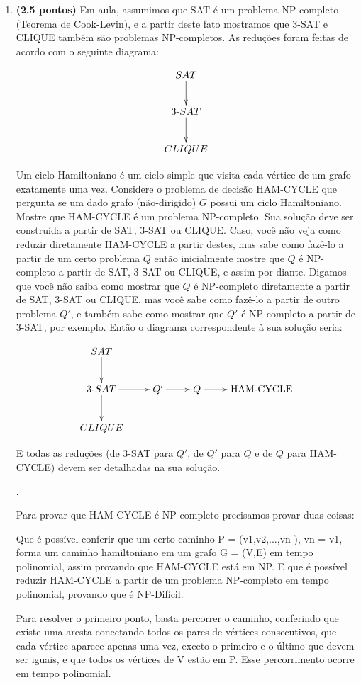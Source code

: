 \documentclass[12pt]{article}
\newcommand{\resposta}[1]{ \noindent {\bf Solução}.{\color{blue} #1}}
\begin{document}
\begin{enumerate}
{ }
  
\item {\bf (2.5 pontos)} Em aula, assumimos que SAT é um problema
  NP-completo (Teorema de Cook-Levin), e a partir deste fato mostramos
  que 3-SAT e CLIQUE também são problemas NP-completos. As reduções
  foram feitas de acordo com o seguinte diagrama:

  $$\xymatrix{
    SAT \ar[d] \\
    3\mbox{-}SAT \ar[d] \\
    CLIQUE 
  }$$
  
  Um ciclo Hamiltoniano é um ciclo simple que visita cada vértice de
  um grafo exatamente uma vez. Considere o problema de decisão
  HAM-CYCLE que pergunta se um dado grafo (não-dirigido) $G$ possui um
  ciclo Hamiltoniano. Mostre que HAM-CYCLE é um problema
  NP-completo. Sua solução deve ser construída a partir de SAT, 3-SAT
  ou CLIQUE. Caso, você não veja como reduzir diretamente HAM-CYCLE a
  partir destes, mas sabe como fazê-lo a partir de um certo problema
  $Q$ então inicialmente mostre que $Q$ é NP-completo a partir de SAT,
  3-SAT ou CLIQUE, e assim por diante. Digamos que você não saiba como
  mostrar que $Q$ é NP-completo diretamente a partir de SAT, 3-SAT ou
  CLIQUE, mas você sabe como fazê-lo a partir de outro problema $Q'$,
  e também sabe como mostrar que $Q'$ é NP-completo a partir de 3-SAT,
  por exemplo. Então o diagrama correspondente à sua solução seria:

$$\xymatrix{
  SAT \ar[d] & & & \\
  3\mbox{-}SAT \ar[d]\ar[r] & Q' \ar[r] & Q \ar[r] & \mbox{HAM-CYCLE}  \\
  CLIQUE & & & 
}$$

E todas as reduções (de 3-SAT para $Q'$, de $Q'$ para $Q$ e de $Q$ para HAM-CYCLE) devem ser detalhadas na sua solução.

\resposta{
    
    Para provar que HAM-CYCLE é NP-completo precisamos provar duas coisas:
    
    Que é possível conferir que um certo caminho P = (v1,v2,...,vn ), vn = v1,  forma um caminho hamiltoniano em um grafo G = (V,E) em tempo polinomial, assim provando que HAM-CYCLE está em NP.
    E que é possível reduzir HAM-CYCLE a partir de um problema NP-completo em tempo polinomial, provando que é NP-Difícil.
    
    Para resolver o primeiro ponto, basta percorrer o caminho, conferindo que existe uma aresta conectando todos os pares de vértices consecutivos, que cada vértice aparece apenas uma vez, exceto o primeiro e o último que devem ser iguais, e que todos os vértices de V estão em P. Esse percorrimento ocorre em tempo polinomial.
    
}
\end{enumerate}
\end{document}
